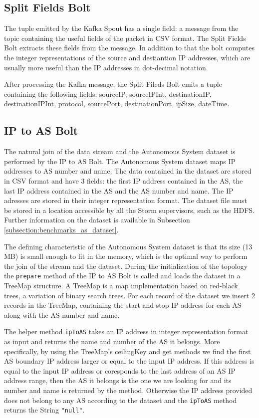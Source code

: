 \subsection{Split Fields Bolt}

The tuple emitted by the Kafka Spout has a single field: a message from the topic containing the useful fields of the packet in CSV format. The Split Fields Bolt extracts these fields from the message. In addition to that the bolt computes the integer representations of the source and destiantion IP addresses, which are usually more useful than the IP addresses in dot-decimal notation.

After processing the Kafka message, the Split Fileds Bolt emits a tuple containing the following fields: sourceIP, sourceIPInt, destinationIP, destinationIPInt, protocol, sourcePort, destinationPort, ipSize, dateTime. 

\subsection{IP to AS Bolt}

The natural join of the data stream and the Autonomous System dataset is performed by the IP to AS Bolt. The Autonomous System dataset maps IP addresses to AS number and name. The data contained in the dataset are stored in CSV format and have 3 fields: the first IP address contained in the AS, the last IP address contained in the AS and the AS number and name. The IP adresses are stored in their integer representation format. The dataset file must be stored in a location accessible by all the Storm supervisors, such as the HDFS. Further information on the dataset is available in Subsection \ref{subsection:benchmarks_as_dataset}.

The defining characteristic of the Autonomous System dataset is that its size (13 MB) is small enough to fit in the memory, which is the optimal way to perform the join of the stream and the dataset. During the initialization of the topology the \texttt{prepare} method of the IP to AS Bolt is called and loads the dataset in a TreeMap structure. A TreeMap is a map implementation based on red-black trees, a variation of binary search trees. For each record of the dataset we insert 2 records in the TreeMap, containing the start and stop IP address for each AS along with the AS number and name.

The helper method \texttt{ipToAS} takes an IP address in integer representation format as input and returns the name and number of the AS it belongs. More specifically, by using the TreeMap's ceilingKey and get methods we find the first AS boundary IP address larger or equal to the input IP address. If this address is equal to the input IP address or coresponds to the last address of an AS IP address range, then the AS it belongs is the one we are looking for and its number and name is returned by the method. Otherwise the IP address provided does not belong to any AS according to the dataset and the \texttt{ipToAS} method returns the String \texttt{"null"}.

